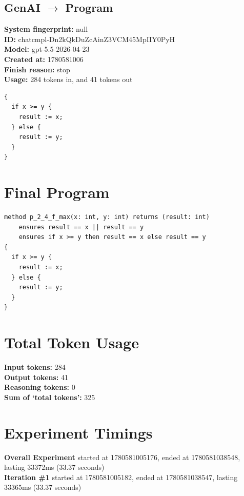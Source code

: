 \documentclass{article}
\begin{document}
\subsection*{GenAI $\rightarrow$ Program}
\textbf{System fingerprint: }null
\\\textbf{ID: }chatcmpl-Dn2kQkDuZcAinZ3VCM45MpIIY0PyH
\\\textbf{Model: }gpt-5.5-2026-04-23
\\\textbf{Created at: }1780581006
\\\textbf{Finish reason: }stop
\\\textbf{Usage: }284 tokens in, and 41 tokens out
\begin{lstlisting}
{
  if x >= y {
    result := x;
  } else {
    result := y;
  }
}
\end{lstlisting}
\section*{Final Program}
\begin{lstlisting}
method p_2_4_f_max(x: int, y: int) returns (result: int)
	ensures result == x || result == y
	ensures if x >= y then result == x else result == y
{
  if x >= y {
    result := x;
  } else {
    result := y;
  }
}
\end{lstlisting}
\section*{Total Token Usage}
\textbf{Input tokens: }284
\\\textbf{Output tokens: }41
\\\textbf{Reasoning tokens: }0
\\\textbf{Sum of `total tokens': }325
\section*{Experiment Timings}
\textbf{Overall Experiment} started at 1780581005176, ended at 1780581038548, lasting 33372ms (33.37 seconds)
\\\textbf{Iteration \#1} started at 1780581005182, ended at 1780581038547, lasting 33365ms (33.37 seconds)
\end{document}
